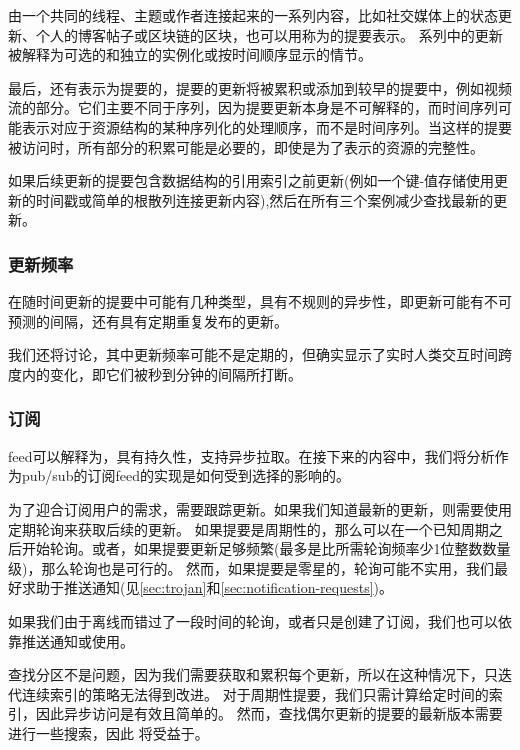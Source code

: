 由一个共同的线程、主题或作者连接起来的一系列内容，比如社交媒体上的状态更新、个人的博客帖子或区块链的区块，也可以用称为的提要表示。
系列中的更新被解释为可选的和独立的实例化或按时间顺序显示的情节。 

最后，还有表示为提要的，提要的更新将被累积或添加到较早的提要中，例如视频流的部分。它们主要不同于序列，因为提要更新本身是不可解释的，而时间序列可能表示对应于资源结构的某种序列化的处理顺序，而不是时间序列。当这样的提要被访问时，所有部分的积累可能是必要的，即使是为了表示的资源的完整性。

如果后续更新的提要包含数据结构的引用索引之前更新(例如一个键-值存储使用更新的时间戳或简单的根散列连接更新内容),然后在所有三个案例减少查找最新的更新。

\subsubsection{更新频率}

在随时间更新的提要中可能有几种类型，具有不规则的异步性，即更新可能有不可预测的间隔，还有具有定期重复发布的更新。

我们还将讨论，其中更新频率可能不是定期的，但确实显示了实时人类交互时间跨度内的变化，即它们被秒到分钟的间隔所打断。

\subsubsection{订阅}

feed可以解释为，具有持久性，支持异步拉取。在接下来的内容中，我们将分析作为pub/sub的订阅feed的实现是如何受到选择的影响的。

为了迎合订阅用户的需求，需要跟踪更新。如果我们知道最新的更新，则需要使用定期轮询来获取后续的更新。 
如果提要是周期性的，那么可以在一个已知周期之后开始轮询。或者，如果提要更新足够频繁(最多是比所需轮询频率少1位整数数量级)，那么轮询也是可行的。
然而，如果提要是零星的，轮询可能不实用，我们最好求助于推送通知(见\ref{sec:trojan}和\ref{sec:notification-requests})。

如果我们由于离线而错过了一段时间的轮询，或者只是创建了订阅，我们也可以依靠推送通知或使用。 

查找分区不是问题，因为我们需要获取和累积每个更新，所以在这种情况下，只迭代连续索引的策略无法得到改进。
对于周期性提要，我们只需计算给定时间的索引，因此异步访问是有效且简单的。 
然而，查找偶尔更新的提要的最新版本需要进行一些搜索，因此 
将受益于。



